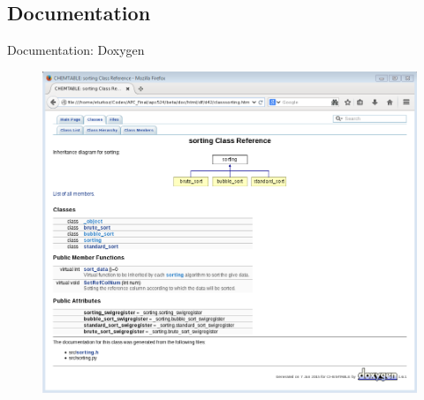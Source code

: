 \documentclass{beamer}
\begin{document}


\subsection{Documentation}
\begin{frame}{Documentation: Doxygen}
\begin{figure}
\includegraphics[scale=0.35]{doxygen.png}
\end{figure}

\end{frame}
\end{document}
